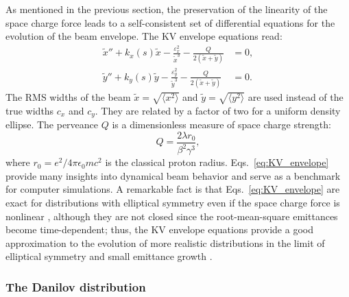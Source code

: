 As mentioned in the previous section, the preservation of the linearity of the space charge force leads to a self-consistent set of differential equations for the evolution of the beam envelope. The KV envelope equations read:
%
\begin{align} \label{eq:KV_envelope}
    \tilde{x}'' + k_{x}(s)\tilde{x} - \frac{\varepsilon_x^2}{\tilde{x}^3} - \frac{Q}{2\left(\tilde{x} + \tilde{y}\right)} &= 0, \\
    \tilde{y}'' + k_{y}(s)\tilde{y} - \frac{\varepsilon_y^2}{\tilde{y}^3} - \frac{Q}{2\left(\tilde{x} + \tilde{y}\right)} &= 0. \nonumber
\end{align}
%
The RMS widths of the beam $\tilde{x} = \sqrt{\langle{{x^2}}\rangle}$ and $\tilde{y} = \sqrt{\langle{{y^2}}\rangle}$ are used instead of the true widths $c_x$ and $c_y$. They are related by a factor of two for a uniform density ellipse. The perveance $Q$ is a dimensionless measure of space charge strength:
%
\begin{equation}\label{eq:perveance}
    Q = \frac{2\lambda r_0}{\beta^2\gamma^3},
\end{equation}
%
where $r_0 = e^2 / 4\pi\epsilon_0mc^2$ is the classical proton radius. Eqs.~\eqref{eq:KV_envelope} provide many insights into dynamical beam behavior and serve as a benchmark for computer simulations. A remarkable fact is that Eqs.~\eqref{eq:KV_envelope} are exact for distributions with elliptical symmetry even if the space charge force is nonlinear \cite{Sacherer1968}, although they are not closed since the root-mean-square emittances become time-dependent; thus, the KV envelope equations provide a good approximation to the evolution of more realistic distributions in the limit of elliptical symmetry and small emittance growth \cite{Lund2004}.



\subsubsection{The Danilov distribution}

